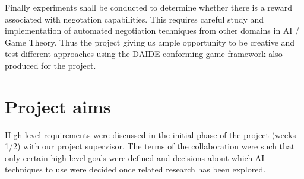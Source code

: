\documentclass[pdftex,12pt,a4paper]{report}
\begin{document}
Finally experiments shall be conducted to determine whether there is a
reward associated with negotation capabilities. This requires careful
study and implementation of automated negotiation techniques from
other domains in AI / Game Theory. Thus the project giving us ample
opportunity to be creative and test different approaches using the
DAIDE-conforming game framework also produced for the project.

\section{Project aims}

High-level requirements were discussed in the initial phase of the
project (weeks 1/2) with our project supervisor. The terms of the
collaboration were such that only certain high-level goals were
defined and decisions about which AI techniques to use were decided once
related research has been explored.
\end{document}
